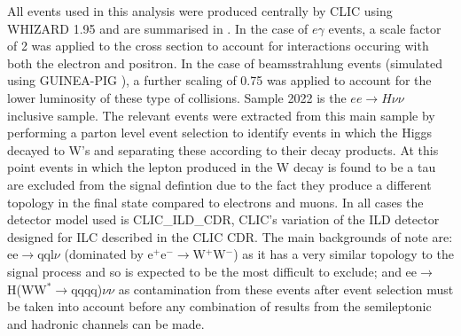 All events used in this analysis were produced centrally by \ac{CLIC} using WHIZARD 1.95 \cite{Kilian:2007gr} and are summarised in . In the case of $e\gamma$ events, a scale factor of 2 was applied to the cross section to account for interactions occuring with both the electron and positron. In the case of beamsstrahlung events (simulated using GUINEA-PIG \cite{Schulte:382453}), a further scaling of 0.75 was applied to account for the lower luminosity of these type of collisions. Sample 2022 is the $ee\rightarrow H\nu\nu$ inclusive sample. The relevant events were extracted from this main sample by performing a parton level event selection to identify events in which the Higgs decayed to W's and separating these according to their decay products. At this point events in which the lepton produced in the W decay is found to be a tau are excluded from the signal defintion due to the fact they produce a different topology in the final state compared to electrons and muons. In all cases the detector model used is CLIC\_ILD\_CDR, CLIC's variation of the ILD detector designed for ILC described in the \ac{CLIC} CDR\cite{CDR}. The main backgrounds of note are: ee$\rightarrow$qql$\nu$ (dominated by e$^+$e$^-\rightarrow$W$^+$W$^-$) as it has a very similar topology to the signal process and so is expected to be the most difficult to exclude; and ee$\rightarrow$ H(WW$^*\rightarrow$qqqq)$\nu\nu$ as contamination from these events after event selection must be taken into account before any combination of results from the semileptonic and hadronic channels can be made.


